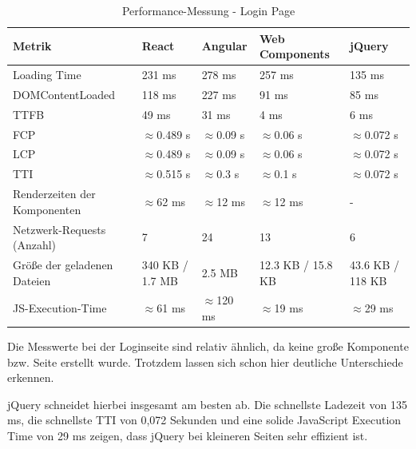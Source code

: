 \documentclass[oneside]{ausarbeitung}
\begin{document}
\begin{table}[H]
\centering
\caption{Performance-Messung - Login Page}
\begin{tabular}{|p{3.5cm}|p{2.5cm}|p{2.5cm}|p{2.5cm}|p{2.5cm}|}
\hline
\textbf{Metrik}                  & \textbf{React} & \textbf{Angular} & \textbf{Web Components} & \textbf{jQuery} \\ \hline
Loading Time                     & 231 ms        & 278 ms           & 257 ms                 & 135 ms          \\ \hline
DOMContentLoaded                 & 118 ms        & 227 ms           & 91 ms                  & 85 ms           \\ \hline
TTFB                             & 49 ms        & 31 ms            & 4 ms                   & 6 ms            \\ \hline
FCP                              & $\approx$0.489 s & $\approx$0.09 s & $\approx$0.06 s        & $\approx$0.072 s \\ \hline
LCP                              & $\approx$0.489 s & $\approx$0.09 s & $\approx$0.06 s        & $\approx$0.072 s \\ \hline
TTI                              & $\approx$0.515 s & $\approx$0.3 s & $\approx$0.1 s         & $\approx$0.072 s \\ \hline
Renderzeiten der Komponenten     & $\approx$62 ms & $\approx$12 ms   & $\approx$12 ms         & - \\ \hline
Netzwerk-Requests (Anzahl)       & 7              & 24               & 13                    & 6               \\ \hline
Größe der geladenen Dateien      & 340 KB / 1.7 MB & 2.5 MB          & 12.3 KB / 15.8 KB     & 43.6 KB / 118 KB \\ \hline
JS-Execution-Time                & $\approx$61 ms       & $\approx$120 ms          & $\approx$19 ms                 & $\approx$29 ms         \\ \hline
\end{tabular}
\end{table}

Die Messwerte bei der Loginseite sind relativ ähnlich, da keine große Komponente bzw. Seite erstellt wurde. Trotzdem lassen sich schon hier deutliche Unterschiede erkennen.

jQuery schneidet hierbei insgesamt am besten ab. Die schnellste Ladezeit von 135 ms, die schnellste TTI von 0,072 Sekunden und eine solide JavaScript Execution Time von 29 ms zeigen, dass jQuery bei kleineren Seiten sehr effizient ist.
\end{document}
